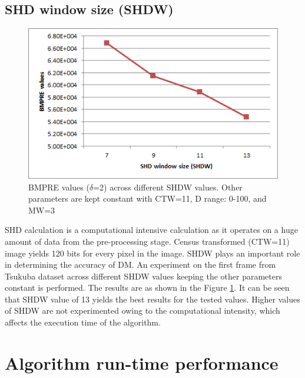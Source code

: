 \subsection{SHD window size (SHDW)}
\label{s:fverificationres:shdw}

\begin{figure}[!htbp]
  \center
  \captionsetup{justification=centering}
  \includegraphics[width=.8\linewidth]{figures/BMPRE2}
  \caption{BMPRE values ($\delta$=2) across different SHDW values. Other parameters are kept constant with CTW=11, D range: 0-100, and MW=3}
  \label{fig:bmpre2}
\end{figure}

SHD calculation is a computational intensive calculation as it operates on a huge amount of data from the pre-processing stage. Census transformed (CTW=11) image yields 120 bits for every pixel in the image. SHDW plays an important role in determining the accuracy of DM. An experiment on the first frame from Tsukuba dataset across different SHDW values keeping the other parameters constant is performed. The results are as shown in the Figure \ref{fig:bmpre2}. It can be seen that SHDW value of 13 yields the best results for the tested values. Higher values of SHDW are not experimented owing to the computational intensity, which affects the execution time of the algorithm.

\section{Algorithm run-time performance}

